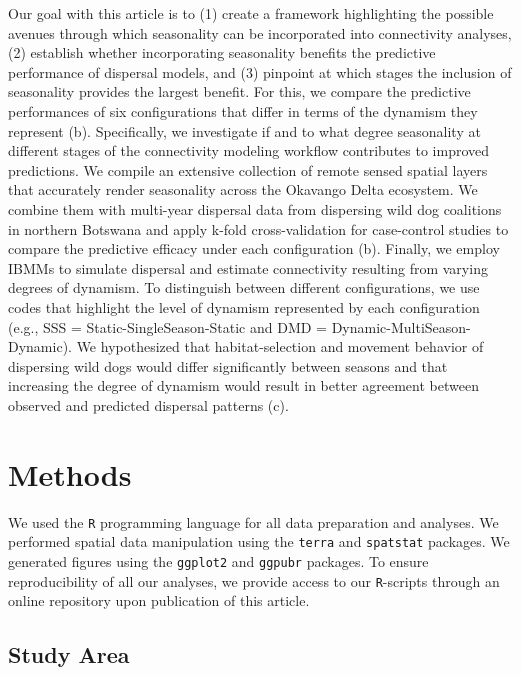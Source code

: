 \documentclass[../FinalThesis.tex]{subfiles}
\begin{document}
Our goal with this article is to (1) create a framework highlighting the
possible avenues through which seasonality can be incorporated into connectivity
analyses, (2) establish whether incorporating seasonality benefits the
predictive performance of dispersal models, and (3) pinpoint at which stages the
inclusion of seasonality provides the largest benefit. For this, we compare the
predictive performances of six configurations that differ in terms of the
dynamism they represent (b). Specifically, we
investigate if and to what degree seasonality at different stages of the
connectivity modeling workflow contributes to improved predictions. We compile
an extensive collection of remote sensed spatial layers that accurately render
seasonality across the Okavango Delta ecosystem. We combine them with multi-year
dispersal data from  dispersing wild dog
coalitions in northern Botswana and apply k-fold cross-validation for
case-control studies to compare the predictive efficacy under each configuration
(b). Finally, we employ IBMMs to simulate dispersal
and estimate connectivity resulting from varying degrees of dynamism. To
distinguish between different configurations, we use codes that highlight the
level of dynamism represented by each configuration (e.g., SSS =
Static-SingleSeason-Static and DMD = Dynamic-MultiSeason-Dynamic). We
hypothesized that habitat-selection and movement behavior of dispersing wild
dogs would differ significantly between seasons and that increasing the degree
of dynamism would result in better agreement between observed and predicted
dispersal patterns (c).

\section{Methods}

We used the \texttt{R} programming language \citep{RCoreTeam.2023} for all data
preparation and analyses. We performed spatial data manipulation using the
\texttt{terra} \citep{Hijmans.2024} and \texttt{spatstat} \citep{Baddeley.2015}
packages. We generated figures using the \texttt{ggplot2} \citep{Wickham.2024}
and \texttt{ggpubr} \citep{Kassambara.2024} packages. To ensure reproducibility
of all our analyses, we provide access to our \texttt{R}-scripts through an
online repository upon publication of this article.

\subsection{Study Area}
\end{document}
